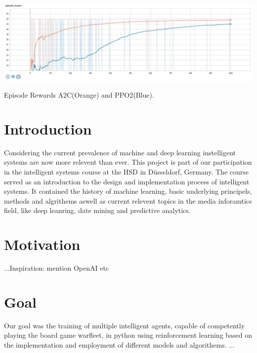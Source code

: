 \documentclass[sigconf]{acmart}
\begin{document}
\begin{teaserfigure}
 \includegraphics[width=\textwidth]{episode_reward_big} %
  \caption{Episode Rewards A2C(Orange) and PPO2(Blue).}
  \label{fig:teaser}
\end{teaserfigure}

\maketitle 

\section{Introduction}
Considering the current prevalence of machine and deep learning instelligent systems are now more relevent than ever.
This project is part of our participation in the intelligent systems course at the HSD in Düsseldorf, Germany. The course served as an introduction to the design and implementation process of intelligent systems. It contained the history of machine learning, basic underlying principels, methods and algrithems aswell as current relevent topics in the media inforamtics field, like deep leanring, date mining and predictive analytics. 

\section{Motivation}
 ...Inspiration: mention OpenAI etc

\section{Goal}
Our goal was the training of multiple intelligent agents, capable of competently playing the board game warfleet, in python using reinforcement learning based on the implementation and employment of different models and algorithems. 
 ...
\end{document}
